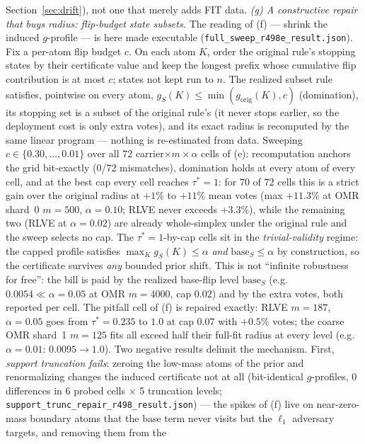 \documentclass{article}
\theoremstyle{definition}
\theoremstyle{remark}
\begin{document}
Section~\ref{sec:drift}), not one that merely adds FIT data.
\emph{(g) A constructive repair that buys radius: flip-budget state
subsets.} The reading of (f) --- shrink the induced $g$-profile --- is
here made executable
(\texttt{full\_sweep\_r498e\_result.json}). Fix a per-atom flip budget
$c$. On each atom $K$, order the original rule's stopping states by
their certificate value and keep the longest prefix whose cumulative
flip contribution is at most $c$; states not kept run to $n$. The
realized subset rule satisfies, pointwise on every atom,
$g_S(K)\le\min(g_{\mathrm{orig}}(K),c)$ (domination), its stopping set
is a subset of the original rule's (it never stops earlier, so the
deployment cost is only extra votes), and its exact radius is
recomputed by the same linear program --- nothing is re-estimated from
data. Sweeping $c\in\{0.30,\dots,0.01\}$ over all 72
carrier$\times m\times\alpha$ cells of (e): recomputation anchors the
grid bit-exactly (0/72 mismatches), domination holds at every atom of
every cell, and at the best cap every cell reaches $\tau^*=1$: for
$70$ of $72$ cells this is a strict gain over the original radius at
$+1\%$ to $+11\%$ mean votes (max $+11.3\%$ at OMR
shard~0 $m{=}500$, $\alpha{=}0.10$; RLVE never exceeds $+3.3\%$),
while the remaining two (RLVE at $\alpha{=}0.02$) are already
whole-simplex under the original rule and the sweep selects no cap.
The $\tau^*=1$-by-cap cells sit in the
\emph{trivial-validity} regime: the capped profile satisfies
$\max_K g_S(K)\le\alpha$ \emph{and} $\mathrm{base}_S\le\alpha$ by
construction, so the certificate survives \emph{any} bounded prior
shift. This is not ``infinite robustness for free'': the bill is paid
by the realized base-flip level $\mathrm{base}_S$ (e.g.\
$0.0054\ll\alpha{=}0.05$ at OMR $m{=}4000$, cap $0.02$) and by the
extra votes, both reported per cell. The pitfall cell of (f) is
repaired exactly: RLVE $m{=}187$, $\alpha{=}0.05$ goes from
$\tau^*=0.235$ to $1.0$ at cap $0.07$ with $+0.5\%$ votes; the coarse
OMR shard~1 $m{=}125$ fits all exceed half their full-fit radius at
every level (e.g.\ $\alpha{=}0.01$: $0.0095\to1.0$). Two negative
results delimit the mechanism. First, \emph{support truncation fails}:
zeroing the low-mass atoms of the prior and renormalizing changes the
induced certificate not at all (bit-identical $g$-profiles, 0
differences in 6 probed cells $\times$ 5 truncation levels;
\texttt{support\_trunc\_repair\_r498\_result.json}) --- the spikes of
(f) live on near-zero-mass boundary atoms that the base term never
visits but the $\ell_1$ adversary targets, and removing them from the
\end{document}
